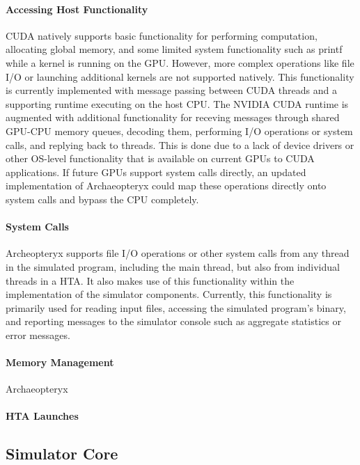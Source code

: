 \documentclass[conference, 10pt]{IEEEtran}
\begin{document}
\paragraph{Accessing Host Functionality}
CUDA natively supports basic functionality for performing computation,
allocating global memory, and some limited system functionality such as printf
while a kernel is running on the GPU.  However, more complex operations like
file I/O or launching additional kernels are not supported natively. 
This functionality is currently implemented with message passing between
CUDA threads and a supporting runtime executing on the host CPU.  The NVIDIA
CUDA runtime is augmented with additional functionality for receving messages
through shared GPU-CPU memory queues, decoding them, performing I/O operations
or system calls, and replying back to threads.  This is done due to a lack of
device drivers or other OS-level functionality that is available on current GPUs
to CUDA applications. If future GPUs support system calls directly, an updated
implementation of Archaeopteryx could map these operations directly onto system
calls and bypass the CPU completely.

\paragraph{System Calls}
Archeopteryx supports file I/O operations or other system calls from any thread
in the simulated program, including the main thread, but also from individual
threads in a HTA.  It also makes use of this functionality within the
implementation of the simulator components. Currently, this functionality is
primarily used for reading input files, accessing the simulated program's
binary, and reporting messages to the simulator console such as aggregate
statistics or error messages. 

\paragraph{Memory Management}
Archaeopteryx 

\paragraph{HTA Launches}

\subsection{Simulator Core}
\end{document}
